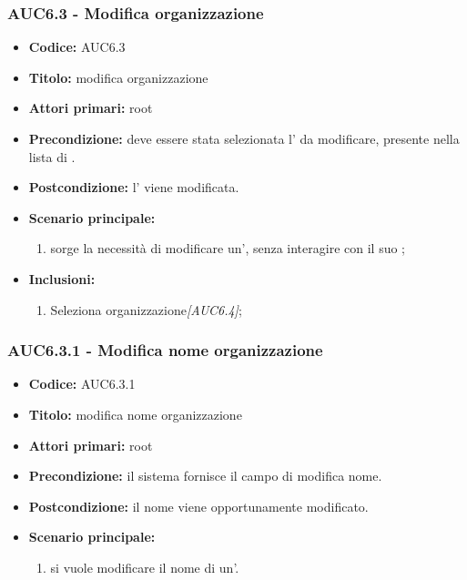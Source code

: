 \documentclass[casi-duso]{subfiles}
\begin{document}
\subsubsection{AUC6.3 - Modifica organizzazione}%
\label{subsub:AUC6.3}
\begin{itemize}
  \item \textbf{Codice:} AUC6.3
  \item \textbf{Titolo:} modifica organizzazione
  \item \textbf{Attori primari:} root
  \item \textbf{Precondizione:} deve essere stata selezionata l' da modificare, presente nella lista di .
  \item \textbf{Postcondizione:} l' viene modificata.
  \item \textbf{Scenario principale:}
  \begin{enumerate}
    \item sorge la necessità di modificare un', senza interagire con il suo ;
  \end{enumerate}
  \item \textbf{Inclusioni:}
  \begin{enumerate}
    \item Seleziona organizzazione\emph{[AUC6.4]};
  \end{enumerate}
\end{itemize}

\subsubsection{AUC6.3.1 - Modifica nome organizzazione}%
\label{subsub:AUC6.3.1}
\begin{itemize}
  \item \textbf{Codice:} AUC6.3.1
  \item \textbf{Titolo:} modifica nome organizzazione
  \item \textbf{Attori primari:} root
  \item \textbf{Precondizione:} il sistema fornisce il campo di modifica nome.
  \item \textbf{Postcondizione:} il nome viene opportunamente modificato.
  \item \textbf{Scenario principale:}
  \begin{enumerate}
    \item si vuole modificare il nome di un'.
  \end{enumerate}

\end{itemize}
\end{document}
